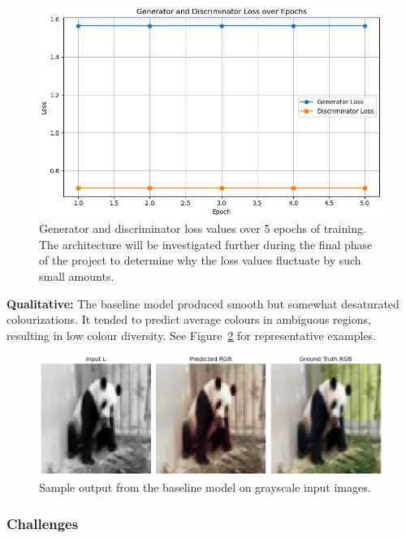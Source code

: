\documentclass{article} %
\begin{document}
\begin{figure}[htbp]
    \centering
    \includegraphics[width=\textwidth]{Figs/baseline_learning_curve.jpg}
    \caption{Generator and discriminator loss values over 5 epochs of training. The architecture will be investigated further during the final phase of the project to determine why 
    the loss values fluctuate by such small amounts.}

    \label{fig:baseline_outputs}
\end{figure}

\textbf{Qualitative:} The baseline model produced smooth but somewhat desaturated colourizations. It tended to predict average colours in ambiguous regions, resulting in low colour 
diversity. See Figure~\ref{fig:baseline_outputs} for representative examples.

\begin{figure}[htbp]
    \centering
    \includegraphics[width=\textwidth]{Figs/baseline_output.png}
    \caption{Sample output from the baseline model on grayscale input images.}
    \label{fig:baseline_outputs}
\end{figure}

\subsubsection{Challenges}
\end{document}

